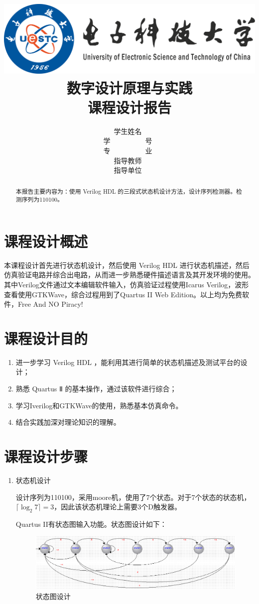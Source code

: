 \documentclass[titlepage,11pt,a4paper]{article}
\title{\includegraphics[scale=0.06]{logo.pdf}\\\song 数字设计原理与实践\\课程设计报告}
\author{\song 学生姓名~\makebox[10em][c]{\uline{\hfill \hfill}}\\
	\song 学~~~~~~~~~~号~\makebox[10em][c]{\uline{\hfill \hfill}}\\
	\song 专~~~~~~~~~~业~\makebox[10em][c]{\uline{\hfill \hfill}}\\
	\song 指导教师~\makebox[10em][c]{\uline{\hfill \hfill}}\\
	\song 指导单位~\makebox[10em][c]{\uline{\hfill 电子科技大学\hfill}}}
\date{}
\begin{document}
\maketitle
\begin{CJK}{UTF8}{gbsn}
\begin{abstract}

\CJKindent 本报告主要内容为：使用 Verilog HDL 的三段式状态机设计方法，设计序列检测器。检测序列为110100。
\end{abstract}
\tableofcontents
\section{课程设计概述}{

\CJKindent 本课程设计首先进行状态机设计，然后使用 Verilog HDL 进行状态机描述，然后仿真验证电路并综合出电路，从而进一步熟悉硬件描述语言及其开发环境的使用。其中Verilog文件通过文本编辑软件输入，仿真验证过程使用Icarus Verilog，波形查看使用GTKWave，综合过程用到了Quartus II Web Edition。以上均为免费软件，Free And NO Piracy!
}
\section{课程设计目的}
\begin{enumerate}
	\item 进一步学习 Verilog HDL ，能利用其进行简单的状态机描述及测试平台的设计；
	\item 熟悉 Quartus Ⅱ 的基本操作，通过该软件进行综合；
	\item 学习Iverilog和GTKWave的使用，熟悉基本仿真命令。
	\item 结合实践加深对理论知识的理解。
	\end{enumerate}
\section{课程设计步骤}
\begin{enumerate}
	\item 状态机设计

	\CJKindent 设计序列为110100，采用moore机，使用了7个状态。对于7个状态的状态机，$\lceil \log_{2}7 \rceil=3$，因此该状态机理论上需要3个D触发器。

	\CJKindent Quartus II有状态图输入功能。状态图设计如下：
	\begin{figure}[H]
		\centering
		\includegraphics[scale=0.4]{editstate.png}
		\caption{状态图设计}
		\end{figure}


\end{enumerate}
\end{CJK}
\end{document}
